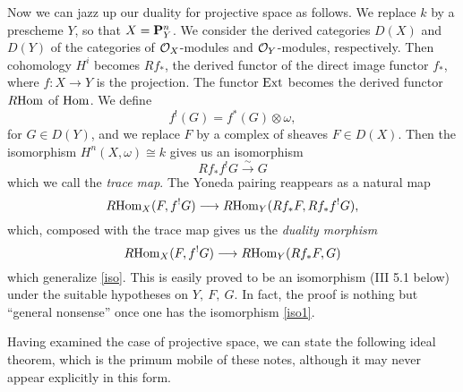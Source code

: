 Now we can jazz up our duality for projective space as follows. We replace $k$ by a prescheme $Y$, so that $X=\mathbf{P}^n_Y$. We consider the derived categories $D(X)$ and $D(Y)$ of the categories of $\mathcal{O}_X$-modules and $\mathcal{O}_Y$-modules, respectively. Then cohomology $H^i$ becomes $Rf_*$, the derived functor of the direct image functor $f_*$, where $f:X\to Y$ is the projection. The functor $\mathrm{Ext}$ becomes the derived functor $R\mathrm{Hom}$ of $\mathrm{Hom}$. We define
\[f^{!}(G)=f^*(G)\otimes \omega,\]
for $G\in D(Y)$, and we replace $F$ by a complex of sheaves $F\in D(X)$. Then the isomorphism $H^n(X,\omega)\cong k$ gives us an isomorphism
\[Rf_*f^!G \xrightarrow{\sim} G \]
which we call the {\it trace map}. The Yoneda pairing reappears as a natural map 
\[R\mathrm{Hom}_X(F,f^!G) \longrightarrow R\mathrm{Hom}_Y(Rf_*F,Rf_*f^!G),\]
which, composed with the trace map gives us the {\it duality morphism}
\[R\mathrm{Hom}_X(F,f^!G) \longrightarrow R\mathrm{Hom}_Y(Rf_*F,G)\]
which generalize \ref{iso}. This is easily proved to be an isomorphism (III 5.1 below) under the suitable hypotheses on $Y,~F,~G$. In fact, the proof is nothing but ``general nonsense'' once one has the isomorphism \ref{iso1}.

Having examined the case of projective space, we can state the following ideal theorem, which is the primum mobile of these notes, although it may never appear explicitly in this form.


